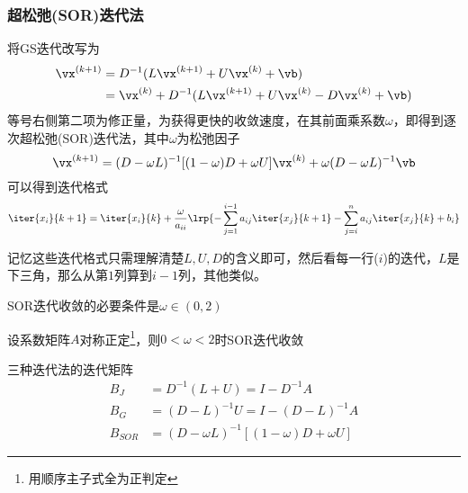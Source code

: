 \subsubsection{超松弛(SOR)迭代法}
将GS迭代改写为
\[\begin{aligned}
    \vx^{(k+1)}&=D^{-1}(L\vx^{(k+1)}+U\vx^{(k)}+\vb)\\
    &=\vx^{(k)}+D^{-1}(L\vx^{(k+1)}+U\vx^{(k)}-D\vx^{(k)}+\vb)
\end{aligned}\]
等号右侧第二项为修正量，为获得更快的收敛速度，在其前面乘系数$\omega$，即得到逐次超松弛(SOR)迭代法，其中$\omega$为松弛因子
\[\vx^{(k+1)}=(D-\omega L)^{-1}[(1-\omega)D+\omega U]\vx^{(k)}+\omega(D-\omega L)^{-1}\vb\]
可以得到迭代格式
\[\iter{x_i}{k+1}=\iter{x_i}{k}+\frac{\omega}{a_{ii}}\lrp{-\sum_{j=1}^{i-1}a_{ij}\iter{x_j}{k+1}-\sum_{j=i}^n a_{ij}\iter{x_j}{k}+b_i}\]

记忆这些迭代格式只需理解清楚$L,U,D$的含义即可，然后看每一行($i$)的迭代，$L$是下三角，那么从第$1$列算到$i-1$列，其他类似。

\begin{theorem}
SOR迭代收敛的必要条件是$\omega\in(0,2)$
\end{theorem}
\begin{theorem}
设系数矩阵$A$对称正定\footnote{用顺序主子式全为正判定}，则$0<\omega<2$时SOR迭代收敛
\end{theorem}

三种迭代法的迭代矩阵
\[\begin{aligned}
    B_J&=D^{-1}(L+U)=I-D^{-1}A\\
    B_G&=(D-L)^{-1}U=I-(D-L)^{-1}A\\
    B_{SOR}&=(D-\omega L)^{-1}[(1-\omega)D+\omega U]
\end{aligned}\]
